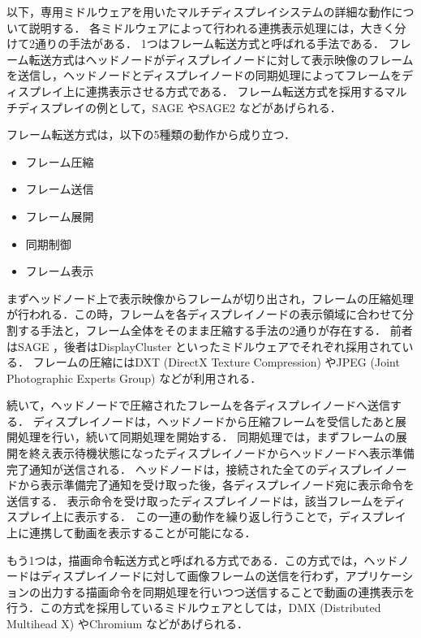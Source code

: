 以下，専用ミドルウェアを用いたマルチディスプレイシステムの詳細な動作について説明する．
各ミドルウェアによって行われる連携表示処理には，大きく分けて2通りの手法がある．
1つはフレーム転送方式と呼ばれる手法である．
フレーム転送方式はヘッドノードがディスプレイノードに対して表示映像のフレームを送信し，ヘッドノードとディスプレイノードの同期処理によってフレームをディスプレイ上に連携表示させる方式である．
フレーム転送方式を採用するマルチディスプレイの例として，SAGE \cite{sage}やSAGE2 \cite{sage2}などがあげられる．

フレーム転送方式は，以下の5種類の動作から成り立つ．

\begin{itemize}
    \item フレーム圧縮
    \item フレーム送信
    \item フレーム展開
    \item 同期制御
    \item フレーム表示
  \end{itemize}

まずヘッドノード上で表示映像からフレームが切り出され，フレームの圧縮処理が行われる．この時，フレームを各ディスプレイノードの表示領域に合わせて分割する手法と，フレーム全体をそのまま圧縮する手法の2通りが存在する．
前者はSAGE \cite{sage}，後者はDisplayCluster \cite{displaycluster}といったミドルウェアでそれぞれ採用されている．
フレームの圧縮にはDXT (DirectX Texture Compression) \cite{dxt}やJPEG (Joint Photographic Experts Group) \cite{jpeg}などが利用される．

続いて，ヘッドノードで圧縮されたフレームを各ディスプレイノードへ送信する．
ディスプレイノードは，ヘッドノードから圧縮フレームを受信したあと展開処理を行い，続いて同期処理を開始する．
同期処理では，まずフレームの展開を終え表示待機状態になったディスプレイノードからヘッドノードへ表示準備完了通知が送信される．
ヘッドノードは，接続された全てのディスプレイノードから表示準備完了通知を受け取った後，各ディスプレイノード宛に表示命令を送信する．
表示命令を受け取ったディスプレイノードは，該当フレームをディスプレイ上に表示する．
この一連の動作を繰り返し行うことで，ディスプレイ上に連携して動画を表示することが可能になる．

もう1つは，描画命令転送方式と呼ばれる方式である．この方式では，ヘッドノードはディスプレイノードに対して画像フレームの送信を行わず，アプリケーションの出力する描画命令を同期処理を行いつつ送信することで動画の連携表示を行う．この方式を採用しているミドルウェアとしては，DMX (Distributed Multihead X) やChromium \cite{chromium}などがあげられる．

